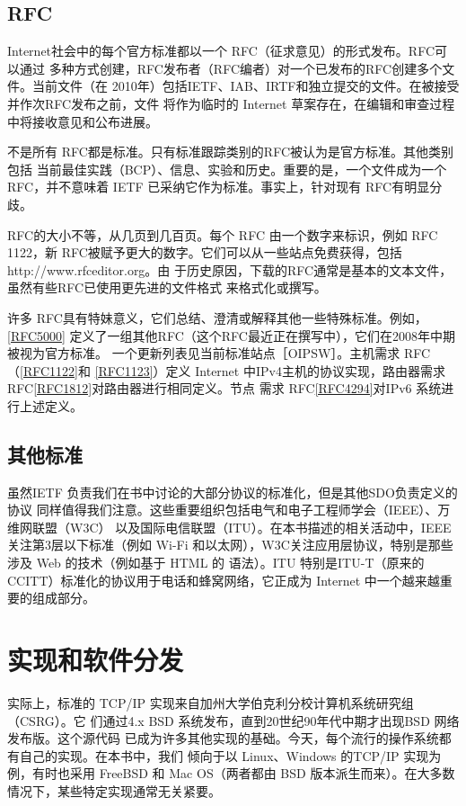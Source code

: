 \subsection{RFC}
Internet社会中的每个官方标准都以一个 RFC（征求意见）的形式发布。RFC可以通过
多种方式创建，RFC发布者（RFC编者）对一个已发布的RFC创建多个文件。当前文件（在
2010年）包括IETF、IAB、IRTF和独立提交的文件。在被接受并作次RFC发布之前，文件
将作为临时的 Internet 草案存在，在编辑和审查过程中将接收意见和公布进展。

不是所有 RFC都是标准。只有标准跟踪类别的RFC被认为是官方标准。其他类别包括
当前最佳实践（BCP）、信息、实验和历史。重要的是，一个文件成为一个 RFC，并不意味着
IETF 已采纳它作为标准。事实上，针对现有 RFC有明显分歧。

RFC的大小不等，从几页到几百页。每个 RFC 由一个数字来标识，例如 RFC 1122，新
RFC被赋予更大的数字。它们可以从一些站点免费获得，包括 http://www.rfceditor.org。由
于历史原因，下载的RFC通常是基本的文本文件，虽然有些RFC已使用更先进的文件格式
来格式化或撰写。

许多 RFC具有特妹意义，它们总结、澄清或解释其他一些特殊标准。例如，\href{https://www.rfc-editor.org/rfc/rfc5000}{[RFC5000]}
定义了一组其他RFC（这个RFC最近正在撰写中），它们在2008年中期被视为官方标准。
一个更新列表见当前标准站点［OIPSW］。主机需求 RFC（\href{https://www.rfc-editor.org/rfc/rfc1122}{[RFC1122]}和 \href{https://www.rfc-editor.org/rfc/rfc1123}{[RFC1123]}）定义
Internet 中IPv4主机的协议实现，路由器需求 RFC\href{https://www.rfc-editor.org/rfc/rfc1812}{[RFC1812]}对路由器进行相同定义。节点
需求 RFC\href{https://www.rfc-editor.org/rfc/rfc4294}{[RFC4294]}对IPv6 系统进行上述定义。
\subsection{其他标准}
虽然IETF 负责我们在书中讨论的大部分协议的标准化，但是其他SDO负责定义的协议
同样值得我们注意。这些重要组织包括电气和电子工程师学会（IEEE）、万维网联盟（W3C）
以及国际电信联盟（ITU）。在本书描述的相关活动中，IEEE 关注第3层以下标准（例如
Wi-Fi 和以太网），W3C关注应用层协议，特别是那些涉及 Web 的技术（例如基于 HTML 的
语法）。ITU 特别是ITU-T（原来的CCITT）标准化的协议用于电话和蜂窝网络，它正成为
Internet 中一个越来越重要的组成部分。

\section{实现和软件分发}
实际上，标准的 TCP/IP 实现来自加州大学伯克利分校计算机系统研究组（CSRG）。它
们通过4.x BSD 系统发布，直到20世纪90年代中期才出现BSD 网络发布版。这个源代码
已成为许多其他实现的基础。今天，每个流行的操作系统都有自己的实现。在本书中，我们
倾向于以 Linux、Windows 的TCP/IP 实现为例，有时也采用 FreeBSD 和 Mac OS（两者都由
BSD 版本派生而来）。在大多数情况下，某些特定实现通常无关紧要。

